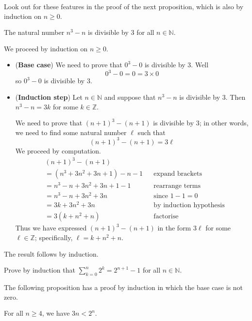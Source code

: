 Look out for these features in the proof of the next proposition, which is also by induction on $n \ge 0$.

\begin{proposition}
The natural number $n^3-n$ is divisible by $3$ for all $n \in \mathbb{N}$.
\end{proposition}

\begin{cproof}
We proceed by induction on $n \ge 0$.
\begin{itemize}
\item (\textbf{Base case}) We need to prove that $0^3-0$ is divisible by $3$. Well
\[ 0^3-0 = 0 = 3 \times 0 \]
so $0^3-0$ is divisible by $3$.

\item (\textbf{Induction step}) Let $n \in \mathbb{N}$ and suppose that $n^3-n$ is divisible by $3$. Then $n^3-n = 3k$ for some $k \in \mathbb{Z}$.

We need to prove that $(n+1)^3 - (n+1)$ is divisible by $3$; in other words, we need to find some natural number $\ell$ such that
\[ (n+1)^3 - (n+1) = 3\ell \]
We proceed by computation.
\begin{align*}
& (n+1)^3 - (n+1) && \\
&= (n^3 + 3n^2 + 3n + 1) - n - 1 && \text{expand brackets}\\
&= n^3 - n + 3n^2 + 3n + 1 - 1 && \text{rearrange terms} \\
&= n^3 - n + 3n^2 + 3n && \text{since $1 - 1 = 0$} \\
&= 3k + 3n^2 + 3n && \text{by induction hypothesis} \\
&= 3(k+n^2+n) && \text{factorise}
\end{align*}
Thus we have expressed $(n+1)^3-(n+1)$ in the form $3\ell$ for some $\ell \in \mathbb{Z}$; specifically, $\ell=k+n^2+n$.
\end{itemize}

The result follows by induction.
\end{cproof}

\begin{exercise}
\label{exSumOfPowersOf2}
Prove by induction that $\displaystyle \sum_{k=0}^n 2^k = 2^{n+1} - 1$ for all $n \in \mathbb{N}$.
\end{exercise}

The following proposition has a proof by induction in which the base case is not zero.

\begin{proposition}
\label{propWeakInductionNonzeroBaseCaseExample}
For all $n \ge 4$, we have $3n < 2^n$.
\end{proposition}

